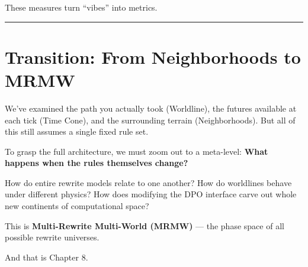 These measures turn “vibes” into metrics.

\begin{center}\rule{0.5\linewidth}{0.5pt}\end{center}

\section{Transition: From Neighborhoods to MRMW}
\label{7.6-transition}

We’ve examined the path you actually took (Worldline), the futures available at each tick (Time Cone), and the surrounding terrain (Neighborhoods). But all of this still assumes a single fixed rule set.

To grasp the full architecture, we must zoom out to a meta-level: \textbf{What happens when the rules themselves change?}

How do entire rewrite models relate to one another? How do worldlines behave under different physics? How does modifying the DPO interface carve out whole new continents of computational space?

This is \textbf{Multi-Rewrite Multi-World (MRMW)} --- the phase space of all possible rewrite universes.

And that is Chapter 8.
